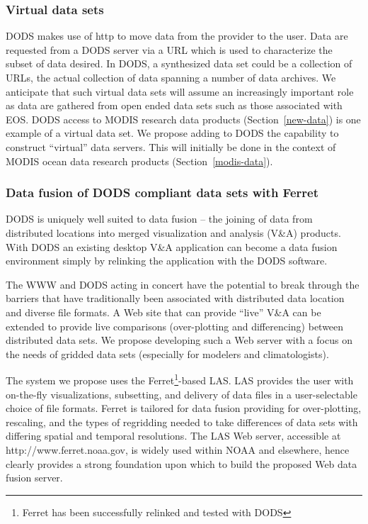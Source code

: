 \documentclass[12pt]{article}
\begin{document}
\subsubsection{Virtual data sets}\label{virtual-data-sets}

\ac{DODS} makes use of \ac{http} to move data from the provider to 
the user. 
Data are requested from a \ac{DODS} server via a \ac{URL} which is used 
to characterize the subset of data desired. In \ac{DODS}, a synthesized 
data set could be a collection of \ac{URL}s, the actual collection of 
data spanning a number of data archives. We anticipate that such 
virtual data sets will assume an increasingly important role as data 
are gathered from open ended data sets such as those associated with 
\acs{EOS}. \ac{DODS} access to \acs{MODIS} research data products 
(Section~\ref{new-data}) is one example of a virtual data set. We
propose adding to \ac{DODS} the capability to construct ``virtual'' 
data servers. This will initially be done in the context of \acs{MODIS} 
ocean data research products (Section~\ref{modis-data}). 

\subsubsection{Data fusion of \ac{DODS} compliant data sets with Ferret}
\label{data-fusion}

\ac{DODS} is uniquely well suited to data fusion -- the joining of 
data from distributed locations into merged visualization and analysis 
(V\&A) products. With \ac{DODS} an existing desktop V\&A 
application can become a data fusion environment simply by relinking 
the application with the \ac{DODS} software.

The \ac{WWW} and \ac{DODS} acting in concert have the potential to
break through the barriers that have traditionally been associated
with distributed data location and diverse file formats. A Web site
that can provide ``live'' V\&A can be extended to provide live 
comparisons (over-plotting and differencing) between distributed 
data sets. We propose developing such a Web server with a focus on 
the needs of gridded data sets (especially for modelers and 
climatologists).

The system we propose uses the Ferret\footnote{Ferret has been 
successfully relinked and tested with \ac{DODS}}-based \ac{LAS}. 
\ac{LAS} provides the user with on-the-fly visualizations, subsetting, 
and delivery of data files in a user-selectable choice of file formats.
Ferret is tailored for data fusion providing for over-plotting, 
rescaling, and the types of regridding needed to take differences 
of data sets with differing spatial and temporal resolutions. The 
\ac{LAS} Web server, accessible at http://www.ferret.noaa.gov, 
is widely used within \ac{NOAA} and elsewhere, hence clearly provides 
a strong foundation upon which to build the proposed Web data fusion 
server. 
\end{document}
